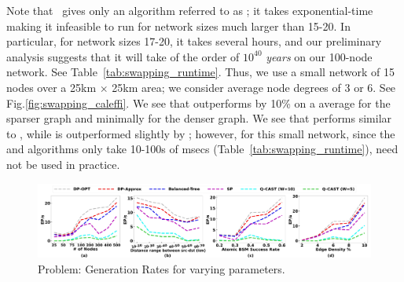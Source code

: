 Note that~\cite{caleffi} gives only an \spp algorithm referred to as
\clf; it takes
exponential-time making it infeasible to run for
network sizes much larger than 15-20. In particular, for network sizes
17-20, it takes several hours, and our preliminary analysis suggests that
it will take of the order of $10^{40}$ \textit{years} on our 100-node
network. See Table~\ref{tab:swapping_runtime}.
Thus, we use a small network of 15 nodes over a 25km $\times$ 25km area;
we consider average node degrees of 3 or 6. See Fig.\ref{fig:swapping_caleffi}.
We see that \dpo outperforms \clf by 10\% on a average for the sparser
graph and minimally for the denser graph. 
We see that \dpa performs similar to \dpo,
while \dpalt is outperformed slightly by \clf; however, for this small
network, since the \dpo and \dpa algorithms only take 10-100s of
msecs (Table~\ref{tab:swapping_runtime}), \dpalt need not be used in practice.  



\begin{figure}[t]
    \centering
    \includegraphics[width=\textwidth]{chapters/tqe/figures/QNR-SP.jpg}
    \caption{\spp Problem: \eps Generation Rates for varying parameters.}
    \label{fig:swapping_spp}
\end{figure}

